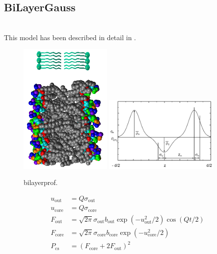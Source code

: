 \subsection{BiLayerGauss}
\label{sect:BiLayerGauss}
~\\
This model has been described in detail in \cite{Pabst2000}.
\begin{figure}[htb]
\begin{center}
\includegraphics[width=0.4\textwidth]{BiLayers.png}
\includegraphics[width=0.5\textwidth]{bilayerprofile.png}
\end{center}
\caption{bilayerprof.}
\label{fig:bilayerprof}
\end{figure}

\begin{align}
   u_\text{out}  &= Q\sigma_\text{out} \\
   u_\text{core} &= Q\sigma_\text{core} \\
   F_\text{out}  &= \sqrt{2\pi}\sigma_\text{out}  b_\text{out}  \exp(-u_\text{out}^2/2) \cos(Qt/2) \\
   F_\text{core} &= \sqrt{2\pi}\sigma_\text{core} b_\text{core} \exp(-u_\text{core}^2/2)  \\
   P_\text{cs}   &=(F_\text{core}+2 F_\text{out})^2
\end{align}
